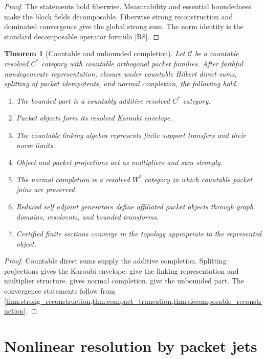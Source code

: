 \documentclass{aomart}
\newtheorem{theorem}{Theorem}[section]
\theoremstyle{definition}
\theoremstyle{remark}
\newcommand{\Ccal}{\mathcal C}
\newcommand{\Rcite}[1]{\textup{[#1]}}
\begin{document}
\begin{proof}
The statements hold fiberwise. Measurability and essential boundedness make the block fields decomposable. Fiberwise strong reconstruction and dominated convergence give the global strong sum. The norm identity is the standard decomposable operator formula \Rcite{R8}.
\end{proof}

\begin{theorem}[Countable and unbounded completion]\label{thm:countable_completion}
Let \(\Ccal\) be a countable resolved \(C^*\) category with countable orthogonal packet families. After faithful nondegenerate representation, closure under countable Hilbert direct sums, splitting of packet idempotents, and normal completion, the following hold.
\begin{enumerate}
\item The bounded part is a countably additive resolved \(C^*\) category.
\item Packet objects form its resolved Karoubi envelope.
\item The countable linking algebra represents finite support transfers and their norm limits.
\item Object and packet projections act as multipliers and sum strongly.
\item The normal completion is a resolved \(W^*\) category in which countable packet joins are preserved.
\item Reduced self adjoint generators define affiliated packet objects through graph domains, resolvents, and bounded transforms.
\item Certified finite sections converge in the topology appropriate to the represented object.
\end{enumerate}
\end{theorem}

\begin{proof}
Countable direct sums supply the additive completion. Splitting projections gives the Karoubi envelope.  give the linking representation and multiplier structure.  gives normal completion.  give the unbounded part. The convergence statements follow from \cref{thm:strong_reconstruction,thm:compact_truncation,thm:decomposable_reconstruction}.
\end{proof}

\section{Nonlinear resolution by packet jets}\label{sec:nonlinear}
\end{document}
